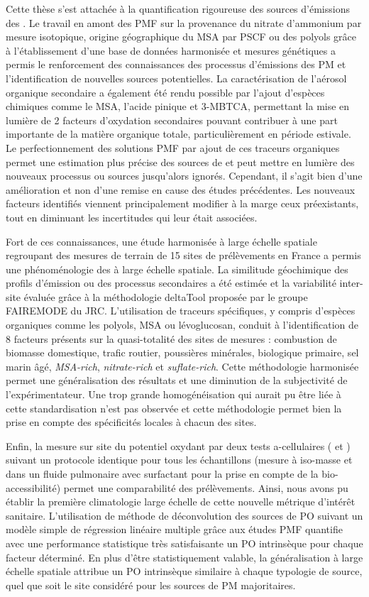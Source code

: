 Cette thèse s'est attachée à la quantification rigoureuse des sources d'émissions des \PMdix.
Le travail en amont des PMF sur la provenance du nitrate d'ammonium par mesure
isotopique, origine géographique du MSA par PSCF ou des polyols grâce à l'établissement
d'une base de données harmonisée et mesures génétiques a permis le renforcement des
connaissances des processus d'émissions des PM et l'identification de nouvelles sources
potentielles.
La caractérisation de l'aérosol organique secondaire a également été rendu possible par
l'ajout d'espèces chimiques comme le MSA, l'acide pinique et 3-MBTCA, permettant la mise
en lumière de 2 facteurs d'oxydation secondaires pouvant contribuer à une part importante
de la matière organique totale, particulièrement en période estivale.
Le perfectionnement des solutions PMF par ajout de ces traceurs organiques permet une
estimation plus précise des sources de \PMdix{} et peut mettre en lumière des nouveaux
processus ou sources jusqu'alors ignorés.
Cependant, il s'agit bien d'une amélioration et non d'une remise en cause des études
précédentes. Les nouveaux facteurs identifiés viennent principalement modifier à la marge ceux
préexistants, tout en diminuant les incertitudes qui leur était associées.

Fort de ces connaissances, une étude harmonisée à large échelle spatiale regroupant des
mesures de terrain de 15 sites de prélèvements en France a permis une phénoménologie des
\PMdix{} à large échelle spatiale. La similitude géochimique des profils d'émission ou
des processus secondaires a été estimée et la variabilité inter-site évaluée grâce
à la méthodologie deltaTool proposée par le groupe FAIREMODE du JRC. L'utilisation de traceurs
spécifiques, y compris d'espèces organiques comme les polyols, MSA ou lévoglucosan,
conduit à l'identification de 8 facteurs présents sur la quasi-totalité des sites de
mesures : combustion de biomasse domestique, trafic routier, poussières minérales,
biologique primaire, sel marin âgé, \textit{MSA-rich}, \textit{nitrate-rich} et \textit{suflate-rich}.
Cette méthodologie harmonisée permet une généralisation des résultats et une diminution de
la subjectivité de l'expérimentateur. Une trop grande homogénéisation qui aurait pu être
liée à cette standardisation n'est pas observée et cette méthodologie permet bien la prise
en compte des spécificités locales à chacun des sites.

Enfin, la mesure sur site du potentiel oxydant par deux tests a-cellulaires (\POAA{} et
\PODTT) suivant un protocole identique pour tous les échantillons (mesure à iso-masse et
dans un fluide pulmonaire avec surfactant pour la prise en compte de la bio-accessibilité) permet une
comparabilité des prélèvements. Ainsi, nous avons pu établir la première climatologie large échelle
de cette nouvelle métrique d'intérêt sanitaire.
L'utilisation de méthode de déconvolution des sources de PO suivant un modèle simple de
régression linéaire multiple grâce aux études PMF quantifie avec une performance
statistique très satisfaisante un PO intrinsèque pour chaque facteur déterminé.
En plus d'être statistiquement valable, la généralisation à large échelle spatiale
attribue un PO intrinsèque similaire à chaque typologie de source, quel que soit le site
considéré pour les sources de PM majoritaires.

